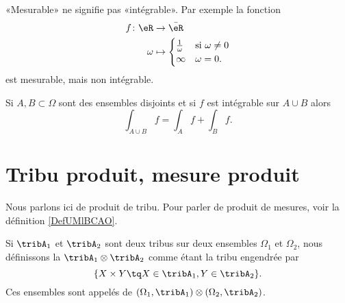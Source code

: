 \begin{remark}
    «Mesurable» ne signifie pas «intégrable». Par exemple la fonction 
    \begin{equation}
        \begin{aligned}
            f\colon \eR&\to \bar\eR \\
            \omega&\mapsto\begin{cases}
            \frac{1}{ \omega }    &   \text{si $ \omega\neq 0$}\\
            \infty    &    \text{$\omega=0$}.
            \end{cases}
        \end{aligned}
    \end{equation}
    est mesurable, mais non intégrable.
\end{remark}

\begin{proposition}     \label{PropOPSCooVpzaBt}
    Si \( A,B\subset \Omega\) sont des ensembles disjoints et si \( f\) est intégrable sur \( A\cup B\) alors
    \begin{equation}
        \int_{A\cup B}f=\int_Af+\int_Bf.
    \end{equation}
\end{proposition}

\section{Tribu produit, mesure produit}

Nous parlons ici de produit de tribu. Pour parler de produit de mesures, voir la définition \ref{DefUMlBCAO}.

\begin{definition}      \label{DefTribProfGfYTuR}
    Si \( \tribA_1\) et \( \tribA_2\) sont deux tribus sur deux ensembles \( \Omega_1\) et \( \Omega_2\), nous définissons la  \( \tribA_1\otimes\tribA_2\) comme étant la tribu engendrée par 
    \begin{equation}
        \{ X\times Y\tq X\in\tribA_1,Y\in\tribA_2 \}.
    \end{equation}
    Ces ensembles sont appelés  de \( (\Omega_1,\tribA_1)\otimes (\Omega_2,\tribA_2)\).
\end{definition}

